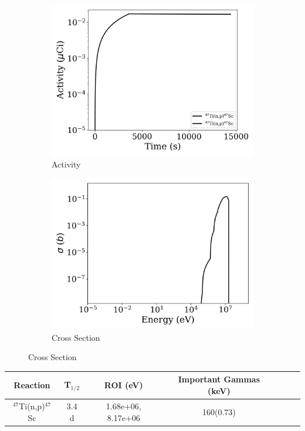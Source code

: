 \begin{figure}[h]
\centering
\begin{subfigure}{.5\textwidth}
  \centering
     \includegraphics[width=.8\textwidth]{plot/Ti-47(n,p)Sc-47_wisconsin1} 

  \caption{Activity}
\end{subfigure}%
\begin{subfigure}{.5\textwidth}
  \centering
     \includegraphics[width=.8\textwidth]{plot/Ti-47(n,p)Sc-47} 

  \caption{Cross Section}
\end{subfigure}
\end{figure}

\begin{table}[h]
\centering
\begin{tabular}{ |c|c|c|c|c|c|c| }
 \hline
 Reaction & T$_{1/2}$ & ROI (eV) & Important Gammas (keV) \\
 \hline 
 $^{47}$Ti(n,p)$^{47}$Sc &  3.4 d & 1.68e+06, 8.17e+06 & 160(0.73) \\ 
\hline
\end{tabular}
\end{table}
